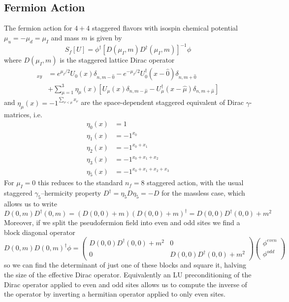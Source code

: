 \documentclass[a4paper,12pt]{article}
\begin{document}
\subsection{Fermion Action}
The fermion action for $4+4$ staggered flavors with isospin chemical potential $\mu_u = -\mu_d = \mu_I$ and mass $m$ is given by
\begin{equation}
\label{eq:action_fermion}
 S_f[U] = \phi^{\dagger} [D(\mu_I,m) D^{\dagger}(\mu_I,m)]^{-1} \phi
\end{equation}
where $D(\mu_I,m)$ is the staggered lattice Dirac operator
\begin{align}
 [D(\mu_I,m)]_{xy} &= e^{\mu_I/2} U_{0}(x) \delta_{n,m-\hat0} - e^{-\mu_I/2} U_{0}^{\dagger}(x-\hat0) \delta_{n,m+\hat0} \\
 &+ \sum_{\mu=1}^{3} \eta_{\mu}(x) \left[ U_{\mu}(x) \delta_{n,m-\hat\mu} - U_{\mu}^{\dagger}(x-\hat\mu) \delta_{n,m+\hat\mu} \right]
\end{align}
and $\eta_{\mu}(x) = -1^{\sum_{\nu<\mu}x_{\nu}}$ are the space-dependent staggered equivalent of Dirac $\gamma$-matrices, i.e.
\begin{align}
 \eta_{0}(x) &= 1 \\
 \eta_{1}(x) &= -1^{x_0} \\
 \eta_{2}(x) &= -1^{x_0+x_1} \\
 \eta_{3}(x) &= -1^{x_0+x_1+x_2} \\
 \eta_{5}(x) &= -1^{x_0+x_1+x_2+x_3}
\end{align}
For $\mu_I=0$ this reduces to the standard $n_f=8$ staggered action, with the usual staggered $\gamma_5$--hermicity property $D^{\dagger} = \eta_5 D \eta_5 = -D$ for the massless case, 
which allows us to write 
\begin{equation}
D(0,m) D^{\dagger}(0,m) = (D(0,0) + m)(D(0,0) + m)^{\dagger} = D(0,0)D^{\dagger}(0,0) + m^2
\end{equation}
Moreover, if we split the pseudofermion field into even and odd sites we find a block diagonal operator
\begin{equation}
D(0,m) D(0,m)^{\dagger} \phi = 
\begin{pmatrix}
D(0,0)D^{\dagger}(0,0) + m^2 & 0 \\
0 & D(0,0)D^{\dagger}(0,0) + m^2
\end{pmatrix}
\begin{pmatrix}
\phi^{even} \\
\phi^{odd}
\end{pmatrix}
\end{equation}
so we can find the determinant of just one of these blocks and square it, halving the size of the effective Dirac operator. Equivalently an LU preconditioning of the Dirac operator 
applied to even and odd sites allows us to compute the inverse of the operator by inverting a hermitian operator applied to only even sites.
\end{document}
